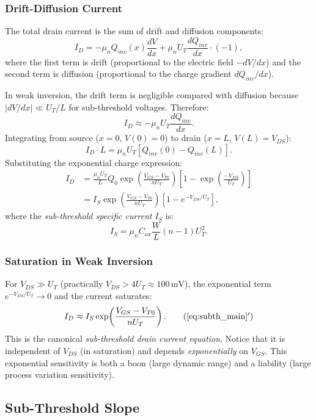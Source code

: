 \subsubsection{Drift-Diffusion Current}

The total drain current is the sum of drift and diffusion components:
\[
  I_D = -\mu_n Q_{inv}(x) \frac{dV}{dx} + \mu_n U_T \frac{dQ_{inv}}{dx} \cdot (-1),
\]
where the first term is drift (proportional to the electric field $-dV/dx$) and the
second term is diffusion (proportional to the charge gradient $dQ_{inv}/dx$).

In weak inversion, the drift term is negligible compared with diffusion because
$|dV/dx| \ll U_T / L$ for sub-threshold voltages.  Therefore:
\[
  I_D \approx -\mu_n U_T \frac{d Q_{inv}}{dx}.
\]
Integrating from source ($x=0$, $V(0)=0$) to drain ($x=L$, $V(L)=V_{DS}$):
\[
  I_D \cdot L = \mu_n U_T \left[ Q_{inv}(0) - Q_{inv}(L) \right].
\]
Substituting the exponential charge expression:
\begin{align}
  I_D &= \frac{\mu_n U_T}{L} Q_0 \exp\!\left(\frac{V_{GS}-V_{T0}}{n U_T}\right)
         \left[1 - \exp\!\left(\frac{-V_{DS}}{U_T}\right)\right] \nonumber \\
      &= I_S \exp\!\left(\frac{V_{GS}-V_{T0}}{n U_T}\right)
         \left[1 - e^{-V_{DS}/U_T}\right], \label{eq:subth_main}
\end{align}
where the \emph{sub-threshold specific current} $I_S$ is:
\[
  I_S = \mu_n C_{ox} \frac{W}{L} (n-1) U_T^2.
\]

\subsubsection{Saturation in Weak Inversion}

For $V_{DS} \gg U_T$ (practically $V_{DS} > 4 U_T \approx 100\,\text{mV}$), the exponential
term $e^{-V_{DS}/U_T} \to 0$ and the current saturates:
\[
  I_D \approx I_S \exp\!\left(\frac{V_{GS}-V_{T0}}{n U_T}\right). \tag{\ref{eq:subth_main}$'$}
\]
This is the canonical \emph{sub-threshold drain current equation}.  Notice that it is
independent of $V_{DS}$ (in saturation) and depends \emph{exponentially} on $V_{GS}$.  This
exponential sensitivity is both a boon (large dynamic range) and a liability (large process
variation sensitivity).

\subsection{Sub-Threshold Slope}

